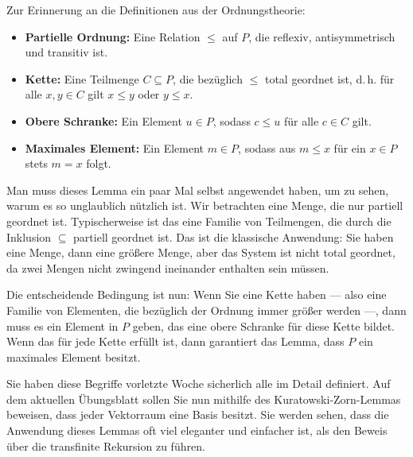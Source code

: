 \begin{math-stroke}

\begin{explanation-of-steps}
Zur Erinnerung an die Definitionen aus der Ordnungstheorie:
\begin{itemize}
    \item \textbf{Partielle Ordnung:} Eine Relation $\le$ auf $P$, die reflexiv, antisymmetrisch und transitiv ist.
    \item \textbf{Kette:} Eine Teilmenge $C \subseteq P$, die bezüglich $\le$ total geordnet ist, d.\,h. für alle $x, y \in C$ gilt $x \le y$ oder $y \le x$.
    \item \textbf{Obere Schranke:} Ein Element $u \in P$, sodass $c \le u$ für alle $c \in C$ gilt.
    \item \textbf{Maximales Element:} Ein Element $m \in P$, sodass aus $m \le x$ für ein $x \in P$ stets $m = x$ folgt.
\end{itemize}
\end{explanation-of-steps}
\end{math-stroke}

\begin{spoken-clean}[01:01:39 - 01:04:13]
Man muss dieses Lemma ein paar Mal selbst angewendet haben, um zu sehen, warum es so unglaublich nützlich ist. Wir betrachten eine Menge, die nur partiell geordnet ist. Typischerweise ist das eine Familie von Teilmengen, die durch die Inklusion $\subseteq$ partiell geordnet ist. Das ist die klassische Anwendung: Sie haben eine Menge, dann eine größere Menge, aber das System ist nicht total geordnet, da zwei Mengen nicht zwingend ineinander enthalten sein müssen.

Die entscheidende Bedingung ist nun: Wenn Sie eine Kette haben --- also eine Familie von Elementen, die bezüglich der Ordnung immer größer werden ---, dann muss es ein Element in $P$ geben, das eine obere Schranke für diese Kette bildet. Wenn das für jede Kette erfüllt ist, dann garantiert das Lemma, dass $P$ ein maximales Element besitzt.

Sie haben diese Begriffe vorletzte Woche sicherlich alle im Detail definiert. Auf dem aktuellen Übungsblatt sollen Sie nun mithilfe des Kuratowski-Zorn-Lemmas beweisen, dass jeder Vektorraum eine Basis besitzt. Sie werden sehen, dass die Anwendung dieses Lemmas oft viel eleganter und einfacher ist, als den Beweis über die transfinite Rekursion zu führen.
\end{spoken-clean}

